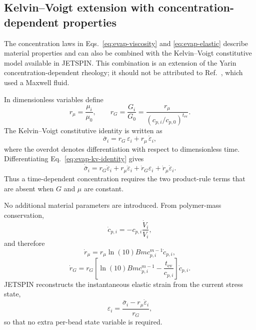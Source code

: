\subsection{Kelvin--Voigt extension with concentration-dependent properties}

The concentration laws in Eqs.~\ref{eq:evap-viscosity} and
\ref{eq:evap-elastic} describe material properties and can also be
combined with the Kelvin--Voigt constitutive model available in JETSPIN.
This combination is an extension of the Yarin concentration-dependent
rheology; it should not be attributed to Ref.~\cite{yarin2001bending},
which used a Maxwell fluid.

In dimensionless variables define
\begin{equation}
 r_\mu=\frac{\mu_i}{\mu_0},\qquad
 r_G=\frac{G_i}{G_0}=\frac{r_\mu}
 {(c_{p,i}/c_{p,0})^{t_{\mathrm{ev}}}}.
\end{equation}
The Kelvin--Voigt constitutive identity is written as
\begin{equation}
 \bar\sigma_i=r_G\,\varepsilon_i+r_\mu\,\dot\varepsilon_i,
 \label{eq:evap-kv-identity}
\end{equation}
where the overdot denotes differentiation with respect to dimensionless
time.  Differentiating Eq.~\ref{eq:evap-kv-identity} gives
\begin{equation}
 \dot{\bar\sigma}_i=
 r_G\dot\varepsilon_i+r_\mu\ddot\varepsilon_i+
 \dot r_G\varepsilon_i+\dot r_\mu\dot\varepsilon_i.
 \label{eq:evap-kv-product}
\end{equation}
Thus a time-dependent concentration requires the two product-rule terms
that are absent when $G$ and $\mu$ are constant.

No additional material parameters are introduced.  From polymer-mass
conservation,
\begin{equation}
 \dot c_{p,i}=-c_{p,i}\frac{\dot V_i}{V_i},
 \label{eq:evap-kv-cpdot}
\end{equation}
and therefore
\begin{equation}
 \dot r_\mu=r_\mu\ln(10)Bm c_{p,i}^{m-1}\dot c_{p,i},
 \label{eq:evap-kv-mudot}
\end{equation}
\begin{equation}
 \dot r_G=r_G\left[\ln(10)Bm c_{p,i}^{m-1}
 -\frac{t_{\mathrm{ev}}}{c_{p,i}}\right]\dot c_{p,i}.
 \label{eq:evap-kv-gdot}
\end{equation}
JETSPIN reconstructs the instantaneous elastic strain from the current
stress state,
\begin{equation}
 \varepsilon_i=\frac{\bar\sigma_i-r_\mu\dot\varepsilon_i}{r_G},
 \label{eq:evap-kv-strain}
\end{equation}
so that no extra per-bead state variable is required.

